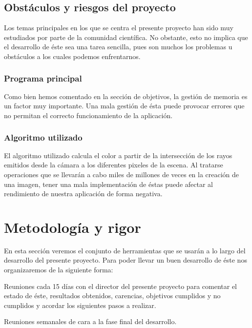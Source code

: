 \documentclass[titlepage,12pt]{report}
\begin{document}
\subsection{Obstáculos y riesgos del proyecto}

Los temas principales en los que se centra el presente proyecto han sido muy estudiados por parte de la comunidad científica. No obstante, esto no implica que el desarrollo de éste sea una tarea sencilla, pues son muchos los problemas u obstáculos a los cuales podemos enfrentarnos.

\subsubsection{Programa principal}

Como bien hemos comentado en la sección de objetivos, la gestión de memoria es un factor muy importante. Una mala gestión de ésta puede provocar errores que no permitan el correcto funcionamiento de la aplicación.

\subsubsection{Algoritmo utilizado}

El algoritmo utilizado calcula el color a partir de la intersección de los rayos emitidos desde la cámara a los diferentes pixeles de la escena. Al tratarse operaciones que se llevarán a cabo miles de millones de veces en la creación de una imagen, tener una mala implementación de éstas puede afectar al rendimiento de nuestra aplicación de forma negativa.

\section{Metodología y rigor}

En esta sección veremos el conjunto de herramientas que se usarán a lo largo del desarrollo del presente proyecto. Para poder llevar un buen desarrollo de éste nos organizaremos de la siguiente forma: \begin{enumerate*}[label=\roman*)] \item Reuniones cada 15 días con el director del presente proyecto para comentar el estado de éste, resultados obtenidos, carencias, objetivos cumplidos y no cumplidos y acordar los siguientes pasos a realizar. \item Reuniones semanales de cara a la fase final del desarrollo. \end{enumerate*}
\end{document}
